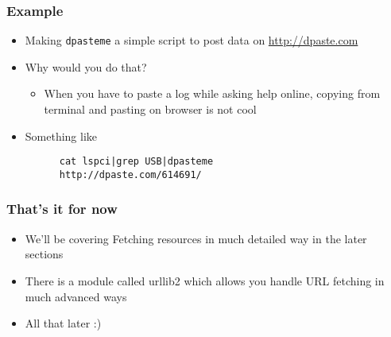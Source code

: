 \documentclass{beamer}
\begin{document}
\begin{frame}[fragile]
\frametitle{Example}
\label{sec-3_9}


\begin{itemize}
\item Making \texttt{dpasteme} a simple script to post data on \href{http://dpaste.com}{http://dpaste.com}
\item Why would you do that?
\begin{itemize}
\item When you have to paste a log while asking help online, copying from terminal and pasting on browser is not cool
\end{itemize}
\item Something like
\begin{verbatim}
      cat lspci|grep USB|dpasteme
      http://dpaste.com/614691/
\end{verbatim}

\end{itemize}
\end{frame}
\begin{frame}
\frametitle{That's it for now}
\label{sec-3_10}


\begin{itemize}
\item We'll be covering Fetching resources in much detailed way in the later sections
\item There is a module called urllib2 which allows you handle URL fetching in much advanced ways
\item All that later :)
\end{itemize}
\end{frame}
\end{document}
